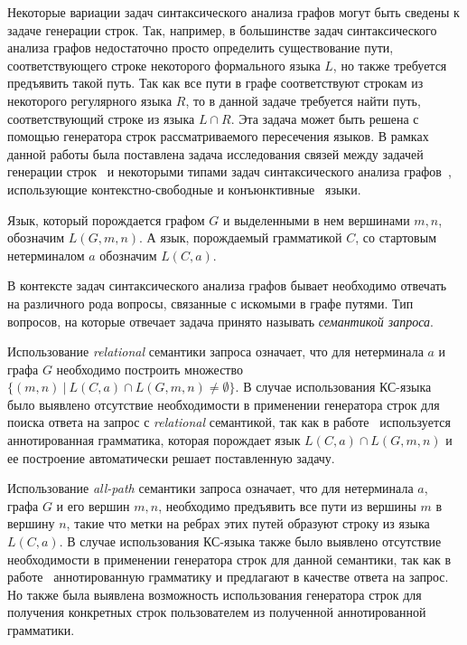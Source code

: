 \documentclass[10pt]{article}
\begin{document}
Некоторые вариации задач синтаксического анализа графов могут быть сведены к задаче генерации строк. Так, например, в большинстве задач синтаксического анализа графов недостаточно просто определить существование пути, соответствующего строке некоторого формального языка $L$, но также требуется предъявить такой путь. Так как все пути в графе соответствуют строкам из некоторого регулярного языка $R$, то в данной задаче требуется найти путь, соответствующий строке из языка $L \cap R$. Эта задача может быть решена с помощью генератора строк рассматриваемого пересечения языков. В рамках данной работы была поставлена задача исследования связей между задачей генерации строк~\cite{azimov-spbu-Okhotin} и некоторыми типами задач синтаксического анализа графов~\cite{azimov-spbu-hellings1, azimov-spbu-hellings2}, использующие контекстно-свободные и конъюнктивные~\cite{azimov-spbu-conj} языки.

Язык, который порождается графом $G$ и выделенными в нем вершинами $m, n$, обозначим $L(G, m, n)$. А язык, порождаемый грамматикой $C$, со стартовым нетерминалом $a$ обозначим $L(C,a)$.

В контексте задач синтаксического анализа графов бывает необходимо отвечать на различного рода вопросы, связанные с искомыми в графе путями. Тип вопросов, на которые отвечает задача принято называть \textit{семантикой запроса}.

Использование \textit{relational} семантики запроса означает, что для нетерминала $a$ и графа $G$ необходимо построить множество $\{(m, n)~|~L(C,a) \cap L(G,m,n) \neq \emptyset \}$. В случае использования КС-языка было выявлено отсутствие необходимости в применении генератора строк для поиска ответа на запрос с \textit{relational} семантикой, так как в работе~\cite{azimov-spbu-hellings2} используется аннотированная грамматика, которая порождает язык $L(C,a) \cap L(G,m,n)$ и ее построение автоматически решает поставленную задачу.

Использование \textit{all-path} семантики запроса означает, что для нетерминала $a$, графа $G$ и его вершин $m,n$, необходимо предъявить все пути из вершины $m$ в вершину $n$, такие что метки на ребрах этих путей образуют строку из языка $L(C,a)$. В случае использования КС-языка также было выявлено отсутствие необходимости в применении генератора строк для данной семантики, так как в работе~\cite{azimov-spbu-hellings2} аннотированную грамматику и предлагают в качестве ответа на запрос. Но также была выявлена возможность использования генератора строк для получения конкретных строк пользователем из полученной аннотированной грамматики.
\end{document}
